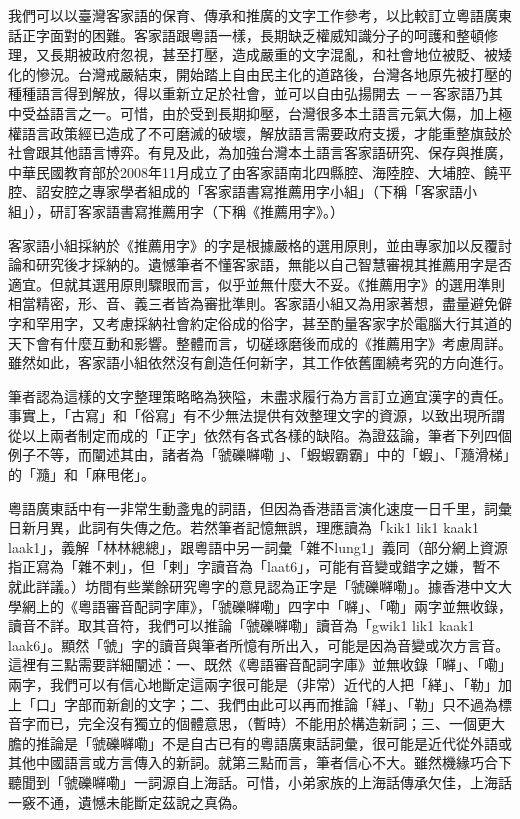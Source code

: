 我們可以以臺灣客家語的保育、傳承和推廣的文字工作參考，以比較訂立粵語廣東話正字面對的困難。客家語跟粵語一樣，長期缺乏權威知識分子的呵護和整頓修理，又長期被政府忽視，甚至打壓，造成嚴重的文字混亂，和社會地位被貶、被矮化的慘況。台灣戒嚴結束，開始踏上自由民主化的道路後，台灣各地原先被打壓的種種語言得到解放，得以重新立足於社會，並可以自由弘揚開去 －－客家語乃其中受益語言之一。可惜，由於受到長期抑壓，台灣很多本土語言元氣大傷，加上極權語言政策經已造成了不可磨滅的破壞，解放語言需要政府支援，才能重整旗鼓於社會跟其他語言博弈。有見及此，為加強台灣本土語言客家語研究、保存與推廣，中華民國教育部於2008年11月成立了由客家語南北四縣腔、海陸腔、大埔腔、饒平腔、詔安腔之專家學者組成的「客家語書寫推薦用字小組」（下稱「客家語小組」），研訂客家語書寫推薦用字（下稱《推薦用字》。）

客家語小組採納於《推薦用字》的字是根據嚴格的選用原則，並由專家加以反覆討論和研究後才採納的。遺憾筆者不懂客家語，無能以自己智慧審視其推薦用字是否適宜。但就其選用原則驟眼而言，似乎並無什麼大不妥。《推薦用字》的選用準則相當精密，形、音、義三者皆為審批準則。客家語小組又為用家著想，盡量避免僻字和罕用字，又考慮採納社會約定俗成的俗字，甚至酌量客家字於電腦大行其道的天下會有什麼互動和影響。整體而言，切磋琢磨後而成的《推薦用字》考慮周詳。 雖然如此，客家語小組依然沒有創造任何新字，其工作依舊圍繞考究的方向進行。

筆者認為這樣的文字整理策略略為狹隘，未盡求履行為方言訂立適宜漢字的責任。事實上，「古寫」和「俗寫」有不少無法提供有效整理文字的資源，以致出現所謂從以上兩者制定而成的「正字」依然有各式各樣的缺陷。為證茲論，筆者下列四個例子不等，而闡述其由，諸者為「虢礫𡃈嘞 」、「蝦蝦霸霸」中的「蝦」、「瀡滑梯」的「瀡」和「麻甩佬」。

粵語廣東話中有一非常生動盞鬼的詞語，但因為香港語言演化速度一日千里，詞彙日新月異，此詞有失傳之危。若然筆者記憶無誤，理應讀為「kik1 lik1 kaak1 laak1」，義解「林林總總」，跟粵語中另一詞彙「雜不lung1」義同（部分網上資源指正寫為「雜不剌」，但「剌」字讀音為「laat6」，可能有音變或錯字之嫌，暫不就此詳議。）坊間有些業餘研究粵字的意見認為正字是「虢礫𡃈嘞」。據香港中文大學網上的《粵語審音配詞字庫》，「虢礫𡃈嘞」四字中「𡃈」、「嘞」兩字並無收錄，讀音不詳。取其音符，我們可以推論「虢礫𡃈嘞」讀音為「gwik1 lik1 kaak1 laak6」。顯然「虢」字的讀音與筆者所憶有所出入，可能是因為音變或次方言音。這裡有三點需要詳細闡述：一、既然《粵語審音配詞字庫》並無收錄「𡃈」、「嘞」兩字，我們可以有信心地斷定這兩字很可能是（非常）近代的人把「緙」、「勒」加上「口」字部而新創的文字；二、我們由此可以再而推論「緙」、「勒」只不過為標音字而已，完全沒有獨立的個體意思，（暫時）不能用於構造新詞；三、一個更大膽的推論是「虢礫𡃈嘞」不是自古已有的粵語廣東話詞彙，很可能是近代從外語或其他中國語言或方言傳入的新詞。就第三點而言，筆者信心不大。雖然機緣巧合下聽聞到「虢礫𡃈嘞」一詞源自上海話。可惜，小弟家族的上海話傳承欠佳，上海話一竅不通，遺憾未能斷定茲說之真偽。

